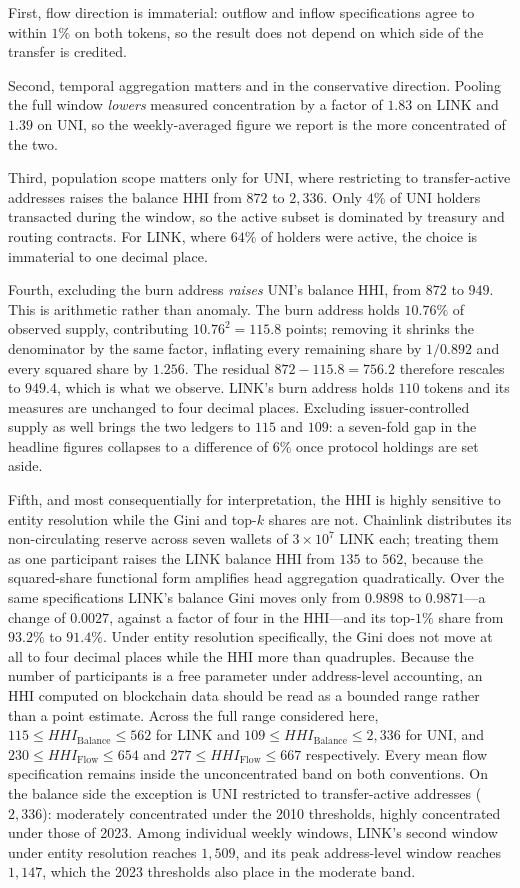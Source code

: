 \documentclass[final,5p,times]{elsarticle}
\begin{document}
First, flow direction is immaterial: outflow and inflow specifications agree
to within $1\%$ on both tokens, so the result does not depend on which side
of the transfer is credited.

Second, temporal aggregation matters and in the conservative direction.
Pooling the full window \emph{lowers} measured concentration by a factor of
$1.83$ on LINK and $1.39$ on UNI, so the weekly-averaged figure we report is
the more concentrated of the two.

Third, population scope matters only for UNI, where restricting to
transfer-active addresses raises the balance HHI from $872$ to $2{,}336$.
Only $4\%$ of UNI holders transacted during the window, so the active subset
is dominated by treasury and routing contracts. For LINK, where $64\%$ of
holders were active, the choice is immaterial to one decimal place.

Fourth, excluding the burn address \emph{raises} UNI's balance HHI, from
$872$ to $949$. This is arithmetic rather than anomaly. The burn address
holds $10.76\%$ of observed supply, contributing $10.76^2 = 115.8$ points;
removing it shrinks the denominator by the same factor, inflating every
remaining share by $1/0.892$ and every squared share by $1.256$. The
residual $872 - 115.8 = 756.2$ therefore rescales to $949.4$, which is what
we observe. LINK's burn address holds $110$ tokens and its measures are
unchanged to four decimal places. Excluding issuer-controlled supply as
well brings the two ledgers to $115$ and $109$: a seven-fold gap in the
headline figures collapses to a difference of $6\%$ once protocol holdings
are set aside.

Fifth, and most consequentially for interpretation, the HHI is highly
sensitive to entity resolution while the Gini and top-$k$ shares are not.
Chainlink distributes its non-circulating reserve across seven wallets of
$3\times10^7$ LINK each; treating them as one participant raises the LINK
balance HHI from $135$ to $562$, because the squared-share functional form
amplifies head aggregation quadratically. Over the same specifications LINK's
balance Gini moves only from $0.9898$ to $0.9871$---a change of $0.0027$,
against a factor of four in the HHI---and its top-$1\%$ share from $93.2\%$ to
$91.4\%$. Under entity resolution specifically, the Gini does not move at all
to four decimal places while the HHI more than quadruples. Because the number of participants is a
free parameter under address-level accounting, an HHI computed on blockchain
data should be read as a bounded range rather than a point estimate. Across
the full range considered here, $115 \le HHI_{\text{Balance}} \le 562$ for
LINK and $109 \le HHI_{\text{Balance}} \le 2{,}336$ for UNI, and
$230 \le HHI_{\text{Flow}} \le 654$ and $277 \le HHI_{\text{Flow}} \le 667$
respectively. Every mean flow specification remains inside the
unconcentrated band on both conventions. On the balance side the exception is
UNI restricted to transfer-active addresses ($2{,}336$): moderately
concentrated under the 2010 thresholds, highly concentrated under those of
2023. Among individual weekly windows, LINK's second window under entity
resolution reaches $1{,}509$, and its peak address-level window reaches
$1{,}147$, which the 2023 thresholds also place in the moderate band.
\end{document}
